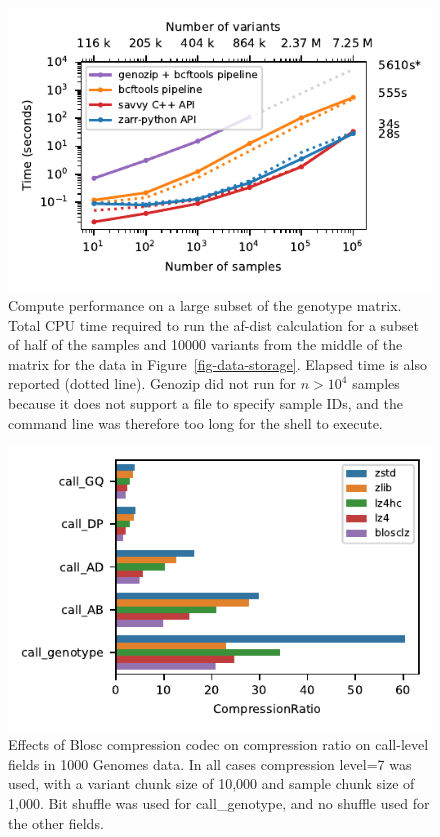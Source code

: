 \documentclass[a4paper,num-refs]{oup-contemporary}
\begin{document}
\begin{figure}[h]
\includegraphics{figures/subset-matrix-compute-supplemental}
\caption{Compute performance on a large subset of the genotype matrix.
Total CPU time required to run the af-dist calculation for
a subset of half of the samples and 10000 variants from the middle of the matrix
for the data in Figure~\ref{fig-data-storage}.
Elapsed time is also reported (dotted line). 
Genozip did not run for
$n > 10^4$ samples because it does not support a file to specify
sample IDs, and the command line was therefore too long for the shell
to execute. 
\label{fig-subset-matrix-compute-supplemental}}
\end{figure}
\begin{figure}[h]

\includegraphics{figures/compression-compressor}
\caption{Effects of Blosc compression codec on compression ratio on call-level 
fields in 1000 Genomes data. 
In all cases compression level=7 was used, with a variant
chunk size of 10,000 and sample chunk size of 1,000.
Bit shuffle was used for call\_genotype, and no shuffle used for the other fields.
\label{fig-compression-compressor}}
\end{figure}
\end{document}
